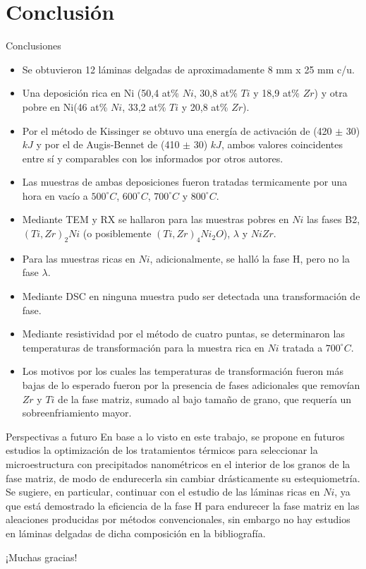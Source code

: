 \documentclass[11pt]{beamer}
\begin{document}
\section{Conclusión}
	\begin{frame}[allowframebreaks]{Conclusiones}
		\begin{itemize}
			\item Se obtuvieron 12 láminas delgadas de aproximadamente 8 mm x 25 mm c/u.
			\item Una deposición rica en Ni (50,4 at\% $Ni$, 30,8 at\% $Ti$ y 18,9 at\% $Zr$) y otra pobre en Ni(46 at\% $Ni$, 33,2 at\% $Ti$ y 20,8 at\% $Zr$).
			\item Por el método de Kissinger se obtuvo una energía de activación de (420 $\pm$ 30) $kJ$ y por el de Augis-Bennet de (410 $\pm$ 30) $kJ$, ambos valores coincidentes entre sí y comparables con los informados por otros autores.
			\item Las muestras de ambas deposiciones fueron tratadas termicamente por una hora en vacío a $500^\circ C$, $600^\circ C$, $700^\circ C$ y $800^\circ C$.
			\item Mediante TEM y RX se hallaron para las muestras pobres en $Ni$ las fases B2, $(Ti, Zr)_2Ni$ (o posiblemente $(Ti, Zr)_4Ni_2O$), $\lambda$ y $NiZr$.
			\item Para las muestras ricas en $Ni$, adicionalmente, se halló la fase H, pero no la fase $\lambda$.
			\item Mediante DSC en ninguna muestra pudo ser detectada una transformación de fase.
			\item Mediante resistividad por el método de cuatro puntas, se determinaron las temperaturas de transformación para la muestra rica en $Ni$ tratada a $700^\circ C$.
			\item Los motivos por los cuales las temperaturas de transformación fueron más bajas de lo esperado fueron por la presencia de fases adicionales que removían $Zr$ y $Ti$ de la fase matriz, sumado al bajo tamaño de grano, que requería un sobreenfriamiento mayor.
		\end{itemize}
	\end{frame}
	
	\begin{frame}{Perspectivas a futuro}
En base a lo visto en este trabajo, se propone en futuros estudios la optimización de los tratamientos térmicos para seleccionar la microestructura con precipitados nanométricos en el interior de los granos de la fase matriz, de modo de endurecerla sin cambiar drásticamente su estequiometría. Se sugiere, en particular, continuar con el estudio de las láminas ricas en $Ni$, ya que está demostrado la eficiencia de la fase H para endurecer la fase matriz en las aleaciones producidas por métodos convencionales, sin embargo no hay estudios en láminas delgadas de dicha composición en la bibliografía.	
	\end{frame}
	\begin{frame}
		\begin{center}
			\Huge ¡Muchas gracias!
		\end{center}
	\end{frame}
\end{document}
